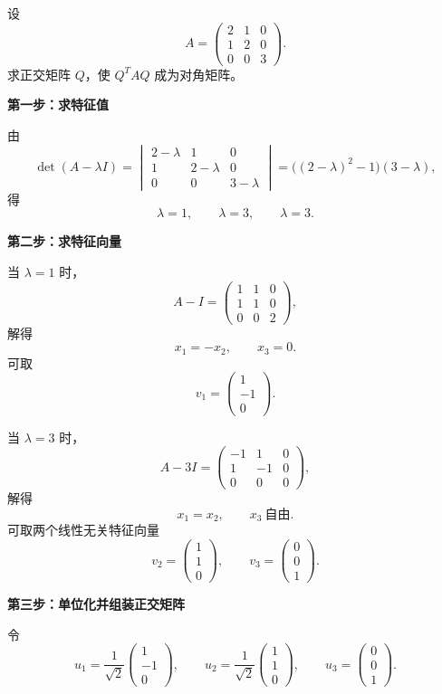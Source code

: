 \documentclass[11pt,oneside,UTF8]{ctexbook}
\begin{document}
\begin{examplebox}[例 9：完整做一次正交对角化]
设
\[
A=
\begin{pmatrix}
2&1&0\\
1&2&0\\
0&0&3
\end{pmatrix}.
\]
求正交矩阵 \(Q\)，使 \(Q^TAQ\) 成为对角矩阵。

\textbf{第一步：求特征值}

由
\[
\det(A-\lambda I)=
\begin{vmatrix}
2-\lambda&1&0\\
1&2-\lambda&0\\
0&0&3-\lambda
\end{vmatrix}
=
\bigl((2-\lambda)^2-1\bigr)(3-\lambda),
\]
得
\[
\lambda=1,\qquad \lambda=3,\qquad \lambda=3.
\]

\textbf{第二步：求特征向量}

当 \(\lambda=1\) 时，
\[
A-I=
\begin{pmatrix}
1&1&0\\
1&1&0\\
0&0&2
\end{pmatrix},
\]
解得
\[
x_1=-x_2,\qquad x_3=0.
\]
可取
\[
v_1=
\begin{pmatrix}
1\\-1\\0
\end{pmatrix}.
\]

当 \(\lambda=3\) 时，
\[
A-3I=
\begin{pmatrix}
-1&1&0\\
1&-1&0\\
0&0&0
\end{pmatrix},
\]
解得
\[
x_1=x_2,\qquad x_3\ \text{自由}.
\]
可取两个线性无关特征向量
\[
v_2=
\begin{pmatrix}
1\\1\\0
\end{pmatrix},
\qquad
v_3=
\begin{pmatrix}
0\\0\\1
\end{pmatrix}.
\]

\textbf{第三步：单位化并组装正交矩阵}

令
\[
u_1=\frac{1}{\sqrt2}
\begin{pmatrix}
1\\-1\\0
\end{pmatrix},
\qquad
u_2=\frac{1}{\sqrt2}
\begin{pmatrix}
1\\1\\0
\end{pmatrix},
\qquad
u_3=
\begin{pmatrix}
0\\0\\1
\end{pmatrix}.
\]


\end{examplebox}
\end{document}
